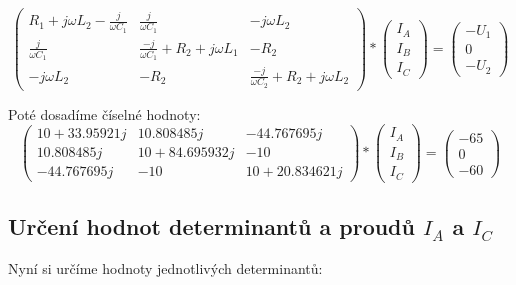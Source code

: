 \documentclass[a4paper]{article}
\begin{document}
\begin{equation*}
\begin{pmatrix}
R_1 + j\omega L_2 - \frac{j}{\omega C_1} & \frac{j}{\omega C_1} & -j\omega L_2 \\
\frac{j}{\omega C_1} & \frac{-j}{\omega C_1} + R_2 + j\omega L_1 & -R_2 \\
-j\omega L_2 & -R_2 & \frac{-j}{\omega C_2} + R_2 + j\omega L_2
\end{pmatrix}
*
\begin{pmatrix}
I_A \\
I_B \\
I_C
\end{pmatrix}
=
\begin{pmatrix}
-U_1 \\
0 \\
-U_2
\end{pmatrix}
\end{equation*}
\newpage

\noindent
Poté dosadíme číselné hodnoty:
\begin{equation*}
\begin{pmatrix}
10 + \num{33,959 21}j & \num{10,808 485}j & \num{-44,767 695}j\\
\num{10,808 485}j & 10 + \num{84,695 932}j & -10\\
 \num{-44,767 695}j & -10 & 10 + \num{20,834 621}j
\end{pmatrix}
*
\begin{pmatrix}
I_A \\
I_B \\
I_C
\end{pmatrix}
=
\begin{pmatrix}
-65 \\
0 \\
-60
\end{pmatrix}
\end{equation*}

\vspace{1cm}
\subsection{Určení hodnot determinantů a proudů $I_A$ a $I_C$}
Nyní si určíme hodnoty jednotlivých determinantů:
\end{document}
